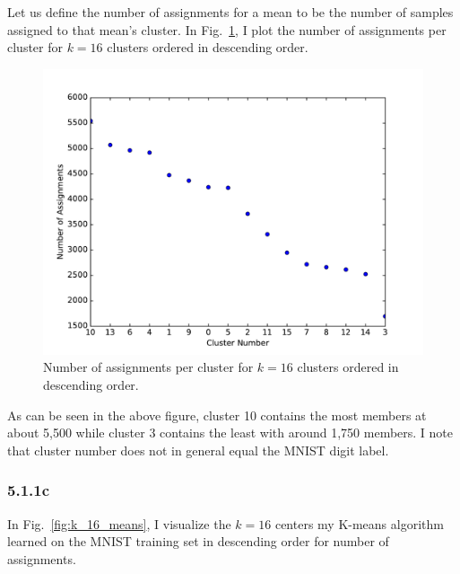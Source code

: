 \documentclass[12pt]{amsart}
\begin{document}
Let us define the number of assignments for a mean to be the number of samples assigned to that mean's cluster.  In Fig.~\ref{fig:k_16_num_assignments}, I plot the number of assignments per cluster for $k = 16$ clusters ordered in descending order.

\begin{figure}[H]
	\includegraphics[width=\columnwidth]{k_16_num_assignments.pdf}
    \caption{Number of assignments per cluster for $k = 16$ clusters ordered in descending order.}
    \label{fig:k_16_num_assignments}
\end{figure}

As can be seen in the above figure, cluster 10 contains the most members at about 5,500 while cluster 3 contains the least with around 1,750 members.  I note that cluster number does not in general equal the MNIST digit label.

\subsubsection*{5.1.1c}

In Fig.~\ref{fig:k_16_means}, I visualize the $k = 16$ centers my K-means algorithm learned on the MNIST training set in descending order for number of assignments.
\end{document}
